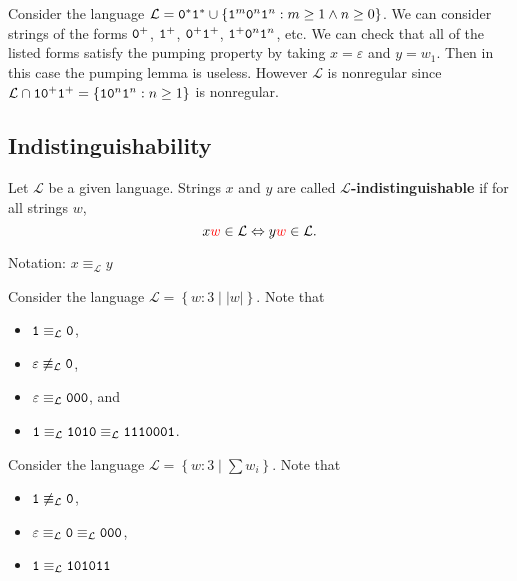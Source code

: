 \documentclass{notes}
\begin{document}
\begin{eg}
  Consider the language $\mathcal L = \verb~0~^* \verb~1~^* \cup \left \{ \verb~1~^m \verb~0~^n \verb~1~^n : m \geq 1 \land n \geq 0 \right \}$.
  We can consider strings of the forms $\verb~0~^+$, $\verb~1~^+$, $\verb~0~^+ \verb~1~^+$, $\verb~1~^+ \verb~0~^n \verb~1~^n$, etc.
  We can check that all of the listed forms satisfy the pumping property by taking $x = \varepsilon$ and $y = w_1$.
  Then in this case the pumping lemma is useless.
  However $\mathcal L$ is nonregular since $\mathcal L \cap \verb~1~ \verb~0~^+ \verb~1~^+ = \left \{ \verb~1~ \verb~0~^n \verb~1~^n : n \geq 1 \right \}$ is nonregular.
\end{eg}

\newpage

\subsection{Indistinguishability}

\begin{defn}
  Let $\mathcal L$ be a given language.
  Strings $x$ and $y$ are called {\boldmath \bfseries $\mathcal L$-indistinguishable} if for all {\color{red} strings $w$}, 
  \[
    x {\color{red} w} \in \mathcal L \Leftrightarrow y {\color{red} w} \in \mathcal L.
  \]
  
  Notation: $x \equiv_{\mathcal L} y$
\end{defn}

\begin{eg}
  Consider the language $\mathcal L = \left \{ w : 3 \mid \left | w \right | \right \}$.
  Note that
  \begin{itemize}
    \item $\verb~1~ \equiv_{\mathcal L} \verb~0~$, 

    \item $\varepsilon \not \equiv_{\mathcal L} \verb~0~$, 

    \item $\varepsilon \equiv_{\mathcal L} \verb~000~$, and 

    \item $\verb~1~ \equiv_{\mathcal L} \verb~1010~ \equiv_{\mathcal L} \verb~1110001~$.
  \end{itemize}
\end{eg}

\begin{eg}
  Consider the language $\mathcal L = \left \{ w : 3 \mid \sum w_i \right \}$.
  Note that 
  \begin{itemize}
    \item $\verb~1~ \not \equiv_{\mathcal L} \verb~0~$, 

    \item $\varepsilon \equiv_{\mathcal L} \verb~0~ \equiv_{\mathcal L} \verb~000~$, 

    \item $\verb~1~ \equiv_{\mathcal L} \verb~101011~$
  \end{itemize}
\end{eg}
\end{document}
